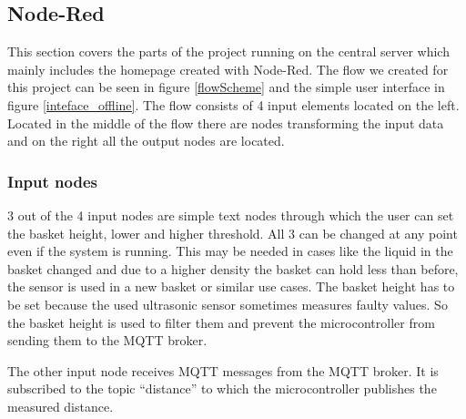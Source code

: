 \documentclass{article}
\begin{document}
\subsection{Node-Red}
This section covers the parts of the project running on the central server which mainly includes the homepage created with Node-Red. The flow we created for this project can be seen in figure \ref{flowScheme} and the simple user interface in figure \ref{inteface_offline}. The flow consists of 4 input elements located on the left. Located in the middle of the flow there are nodes transforming the input data and on the right all the output nodes are located.\par 
\subsubsection{Input nodes}
3 out of the 4 input nodes are simple text nodes through which the user can set the basket height, lower and higher threshold. All 3 can be changed at any point even if the system is running. This may be needed in cases like the liquid in the basket changed and due to a higher density the basket can hold less than before, the sensor is used in a new basket or similar use cases. The basket height has to be set because the used ultrasonic sensor sometimes measures faulty values. So the basket height is used to filter them and prevent the microcontroller from sending them to the MQTT broker.\par
The other input node receives MQTT messages from the MQTT broker. It is subscribed to the topic \enquote{distance} to which the microcontroller publishes the measured distance.
\end{document}
